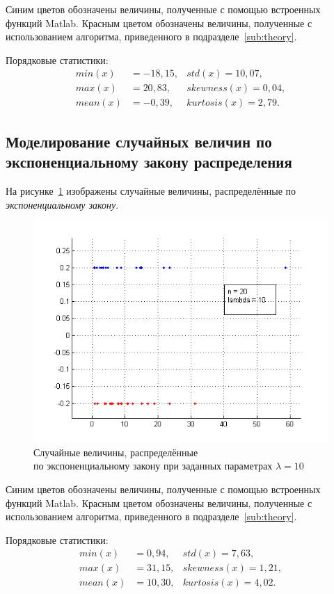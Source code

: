 Синим цветов обозначены величины, полученные с помощью
встроенных функций Matlab. Красным цветом обозначены величины, полученные
с использованием алгоритма, приведенного в подразделе~\ref{sub:theory}.

Порядковые статистики:
\begin{align*}
  min (x)  &= -18,15, & std (x) = 10,07, \\
  max (x)  &= 20,83,  & skewness (x) = 0,04, \\
  mean (x) &= -0,39,  & kurtosis (x) = 2,79.
\end{align*}

\newpage

\subsection{Моделирование случайных величин по экспоненциальному закону распределения}

На рисунке~\ref{pic:exp} изображены случайные величины, распределённые
по \textit{экспоненциальному закону}.
\begin{figure}[h!]
  \centering
  \includegraphics[width=1\linewidth]{pic/exp}
  \caption{Случайные величины, распределённые \\ по экспоненциальному закону при заданных параметрах $ \lambda = 10 $}
  \label{pic:exp}
\end{figure}

Синим цветов обозначены величины, полученные с помощью
встроенных функций Matlab. Красным цветом обозначены величины, полученные
с использованием алгоритма, приведенного в подразделе~\ref{sub:theory}.

Порядковые статистики:
\begin{align*}
  min (x)  &= 0,94,  & std (x) = 7,63, \\
  max (x)  &= 31,15, & skewness (x) = 1,21, \\
  mean (x) &= 10,30, & kurtosis (x) = 4,02.
\end{align*}

\newpage
